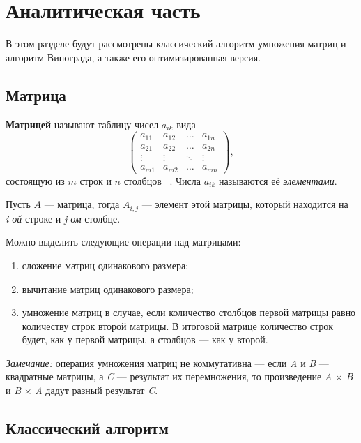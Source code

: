 \chapter{Аналитическая часть}

В этом разделе будут рассмотрены классический алгоритм умножения матриц и алгоритм Винограда, а также его оптимизированная версия.

\section{Матрица}

\textbf{Матрицей} называют таблицу чисел $a_{ik}$ вида
\begin{equation}
	\begin{pmatrix}
		a_{11} & a_{12} & \ldots & a_{1n}\\
		a_{21} & a_{22} & \ldots & a_{2n}\\
		\vdots & \vdots & \ddots & \vdots\\
		a_{m1} & a_{m2} & \ldots & a_{mn}
	\end{pmatrix},
\end{equation}
состоящую из $m$ строк и $n$ столбцов ~\cite{book_matrix}. Числа $a_{ik}$ называются её \textit{элементами}.

Пусть $A$ --- матрица, тогда $A_{i,j}$ --- элемент этой матрицы, который находится на \textit{i-ой} строке и \textit{j-ом} столбце.

Можно выделить следующие операции над матрицами:
\begin{enumerate}[label=\arabic*)]
	\item сложение матриц одинакового размера;
	\item вычитание матриц одинакового размера;
	\item умножение матриц в случае, если количество столбцов первой матрицы равно количеству строк второй матрицы. В итоговой матрице количество строк будет, как у первой матрицы, а столбцов --- как у второй.
\end{enumerate}

\textit{Замечание:} операция умножения матриц не коммутативна --- если \textit{A} и \textit{B} --- квадратные матрицы, а \textit{C} --- результат их перемножения, то произведение \textit{A} $\times$ \textit{B} и \textit{B} $\times$ \textit{A} дадут разный результат \textit{C}.

\clearpage

\section{Классический алгоритм}

